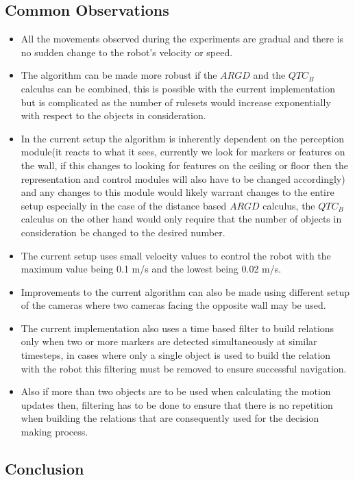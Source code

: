 \subsection{Common Observations}
\begin{itemize}
	\item All the movements observed during the experiments are gradual and there is no sudden change to the robot's velocity or speed.
	\item The algorithm can be made more robust if the $ARGD$ and the $QTC_B$ calculus can be combined, this is possible with the current implementation but is complicated as the number of rulesets would increase exponentially with respect to the objects in consideration.
	\item In the current setup the algorithm is inherently dependent on the perception module(it reacts to what it sees, currently we look for markers or features on the wall, if this changes to looking for features on the ceiling or floor then the representation and control modules will also have to be changed accordingly) and any changes to this module would likely warrant changes to the entire setup especially in the case of the distance based $ARGD$ calculus, the $QTC_B$ calculus on the other hand would only require that the number of objects in consideration be changed to the desired number.
	\item The current setup uses small velocity values to control the robot with the maximum value being 0.1 m/s and the lowest being 0.02 m/s.
	\item Improvements to the current algorithm can also be made using different setup of the cameras where two cameras facing the opposite wall may be used.
	\item The current implementation also uses a time based filter to build relations only when two or more markers are detected simultaneously at similar timesteps, in cases where only a single object is used to build the relation with the robot this filtering must be removed to ensure successful navigation.
	\item Also if more than two objects are to be used when calculating the motion updates then, filtering has to be done to ensure that there is no repetition when building the relations that are consequently used for the decision making process.
\end{itemize}

\subsection{Conclusion} 
